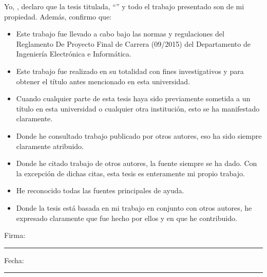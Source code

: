 \documentclass[
11pt, %
english, %
spanish,
singlespacing, %
liststotoc, %
parskip, %
headsepline, %
]{MastersDoctoralThesis} %
\begin{document}
\renewcommand{\authorshipname}{Declaración de autoría}

\begin{declaration}
\addchaptertocentry{\authorshipname}

\noindent Yo, \authorname, declaro que la tesis titulada, \enquote{\ttitle} y todo el trabajo presentado son de mi propiedad. Además, confirmo que:

\begin{itemize}
\item Este trabajo fue llevado a cabo bajo las normas y regulaciones del Reglamento De Proyecto Final de Carrera (09/2015) del Departamento de Ingeniería Electrónica e Informática.
\item Este trabajo fue realizado en su totalidad con fines investigativos y para obtener el título antes mencionado en esta universidad.
\item Cuando cualquier parte de esta tesis haya sido previamente sometida a un título en esta universidad o cualquier otra institución, esto se ha manifestado claramente.
\item Donde he consultado trabajo publicado por otros autores, eso ha sido siempre claramente atribuido.
\item Donde he citado trabajo de otros autores, la fuente siempre se ha dado. Con la excepción de dichas citas, esta tesis es enteramente mi propio trabajo.
\item He reconocido todas las fuentes principales de ayuda.
\item Donde la tesis está basada en mi trabajo en conjunto con otros autores, he expresado claramente que fue hecho por ellos y en que he contribuido.\\
\end{itemize}

\noindent Firma:\\
\rule[0.5em]{25em}{0.5pt} %

\noindent Fecha:\\
\rule[0.5em]{25em}{0.5pt} %
\end{declaration}

\cleardoublepage


\end{document}
